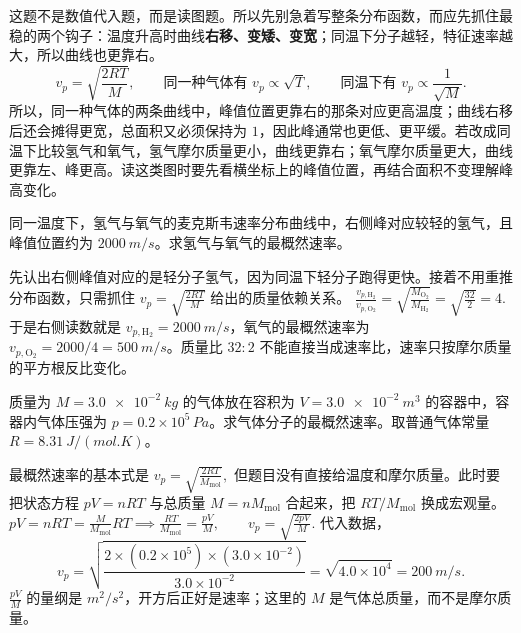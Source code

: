 \documentclass[lang=cn,11pt]{elegantbook}
\begin{document}
\begin{solution}
这题不是数值代入题，而是读图题。所以先别急着写整条分布函数，而应先抓住最稳的两个钩子：温度升高时曲线\textbf{右移、变矮、变宽}；同温下分子越轻，特征速率越大，所以曲线也更靠右。
\[
v_p=\sqrt{\frac{2RT}{M}},\qquad
\text{同一种气体有 }v_p\propto\sqrt T,\qquad
\text{同温下有 }v_p\propto\frac1{\sqrt M}.
\]
所以，同一种气体的两条曲线中，峰值位置更靠右的那条对应更高温度；曲线右移后还会摊得更宽，总面积又必须保持为 \(1\)，因此峰通常也更低、更平缓。若改成同温下比较氢气和氧气，氢气摩尔质量更小，曲线更靠右；氧气摩尔质量更大，曲线更靠左、峰更高。读这类图时要先看横坐标上的峰值位置，再结合面积不变理解峰高变化。
\end{solution}

\begin{exercise}[从同温氢气和氧气的分布图怎样反推最概然速率]
同一温度下，氢气与氧气的麦克斯韦速率分布曲线中，右侧峰对应较轻的氢气，且峰值位置约为 \(\SI{2000}{m/s}\)。求氢气与氧气的最概然速率。
\end{exercise}

\begin{solution}
先认出右侧峰值对应的是轻分子氢气，因为同温下轻分子跑得更快。接着不用重推分布函数，只需抓住
 \(v_p=\sqrt{\frac{2RT}{M}}\) 
给出的质量依赖关系。
 \(\frac{v_{p,\mathrm{H_2}}}{v_{p,\mathrm{O_2}}} =\sqrt{\frac{M_{\mathrm{O_2}}}{M_{\mathrm{H_2}}}} =\sqrt{\frac{32}{2}}=4.\) 
于是右侧读数就是 \(v_{p,\mathrm{H_2}}=\SI{2000}{m/s}\)，氧气的最概然速率为 \(v_{p,\mathrm{O_2}}=2000/4=\SI{500}{m/s}\)。质量比 \(32:2\) 不能直接当成速率比，速率只按摩尔质量的平方根反比变化。
\end{solution}

\begin{exercise}
质量为 \(M=\SI{3.0e-2}{kg}\) 的气体放在容积为 \(V=\SI{3.0e-2}{m^3}\) 的容器中，容器内气体压强为 \(p=0.2\times10^5\,\si{Pa}\)。求气体分子的最概然速率。取普通气体常量 \(R=\SI{8.31}{J/(mol.K)}\)。
\end{exercise}

\begin{solution}
最概然速率的基本式是
 \(v_p=\sqrt{\frac{2RT}{M_{\mathrm{mol}}}},\) 
但题目没有直接给温度和摩尔质量。此时要把状态方程 \(pV=nRT\) 与总质量 \(M=nM_{\mathrm{mol}}\) 合起来，把 \(RT/M_{\mathrm{mol}}\) 换成宏观量。
 \(pV=nRT=\frac{M}{M_{\mathrm{mol}}}RT \implies \frac{RT}{M_{\mathrm{mol}}}=\frac{pV}{M},\qquad v_p=\sqrt{\frac{2pV}{M}}.\) 
代入数据，
\[
v_p=\sqrt{\frac{2\times(0.2\times10^5)\times(3.0\times10^{-2})}{3.0\times10^{-2}}}
=\sqrt{4.0\times10^4}
=\SI{200}{m/s}.
\]
\(\frac{pV}{M}\) 的量纲是 \(\si{m^2/s^2}\)，开方后正好是速率；这里的 \(M\) 是气体总质量，而不是摩尔质量。
\end{solution}
\end{document}
